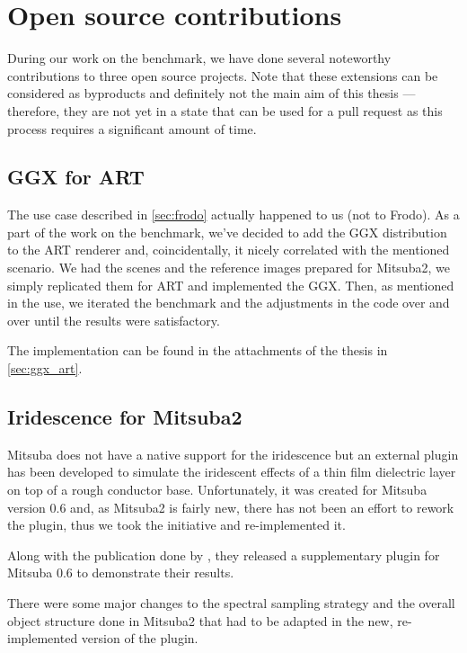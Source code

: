 \section{Open source contributions}

During our work on the benchmark, we have done several noteworthy contributions to three open source projects. Note that these extensions can be considered as byproducts and definitely not the main aim of this thesis --- therefore, they are not yet in a state that can be used for a pull request as this process requires a significant amount of time.

\subsection{GGX for ART}

The use case described in \autoref{sec:frodo} actually happened to us (not to Frodo). As a part of the work on the benchmark, we've decided to add the GGX distribution to the ART renderer and, coincidentally, it nicely correlated with the mentioned scenario. We had the scenes and the reference images prepared for Mitsuba2, we simply replicated them for ART and implemented the GGX. Then, as mentioned in the use, we iterated the benchmark and the adjustments in the code over and over until the results were satisfactory.

The implementation can be found in the attachments of the thesis in \autoref{sec:ggx_art}.

\subsection{Iridescence for Mitsuba2}

Mitsuba does not have a native support for the iridescence but an external plugin has been developed to simulate the iridescent effects of a thin film dielectric layer on top of a rough conductor base. Unfortunately, it was created for Mitsuba version 0.6 and, as Mitsuba2 is fairly new, there has not been an effort to rework the plugin, thus we took the initiative and re-implemented it.

Along with the publication done by \citet{belcour2017practical}, they released a supplementary plugin for Mitsuba 0.6 to demonstrate their results.

There were some major changes to the spectral sampling strategy and the overall object structure done in Mitsuba2 that had to be adapted in the new, re-implemented version of the plugin.

